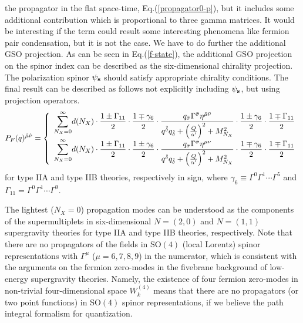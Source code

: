 \documentclass[a4paper,prd,preprint]{revtex4}
\begin{document}
 the propagator in the flat space-time, Eq.(\ref{propagator0-p}),
 but it includes some additional contribution
 which is proportional to three gamma matrices.
It would be interesting
 if the term could result some interesting phenomena
 like fermion pair condensation,
 but it is not the case.
We have to do further the additional GSO projection.
As can be seen in Eq.(\ref{f-state}),
 the additional GSO projection on the spinor index
 can be described as the six-dimensional chirality projection.
The polarization spinor $\psi_{\bf s}$
 should satisfy appropriate chirality conditions.
The final result can be described as follows
 not explicitly including $\psi_{\bf s}$,
 but using projection operators.
\begin{equation}
 P_F(q)^{{\hat \mu}{\hat \nu}} =
 \left\{
 \begin{array}{l}
  \displaystyle{\sum_{N_X=0}^\infty} d(N_X) \cdot
   {{1 \pm \Gamma_{11}} \over 2} \cdot
   {{1 \mp \gamma_6} \over 2} \cdot
  {{q_{\bar \sigma} \Gamma^{\bar \sigma} \eta^{{\bar \mu}{\bar \nu}}}
   \over
   {
   q^{\tilde \delta} q_{\tilde \delta}
   + \left( {Q \over {\alpha'}} \right)^2 + M_{N_X}^2
   }} \cdot
   {{1 \pm \gamma_6} \over 2} \cdot
   {{1 \mp \Gamma_{11}} \over 2}
 \\
  \displaystyle{\sum_{N_X=0}^\infty} d(N_X) \cdot
   {{1 \pm \Gamma_{11}} \over 2} \cdot
   {{1 \pm \gamma_6} \over 2} \cdot
  {{q_{\bar \sigma} \Gamma^{\bar \sigma} \eta^{{\mu}{\nu}}}
   \over
   {
   q^{\tilde \delta} q_{\tilde \delta}
   + \left( {Q \over {\alpha'}} \right)^2 + M_{N_X}^2
   }} \cdot
   {{1 \mp \gamma_6} \over 2} \cdot
   {{1 \mp \Gamma_{11}} \over 2}
 \end{array}
 \right.
\label{propagator-final}
\end{equation}
 for type IIA and type IIB theories, respectively in sign,
 where $\gamma_6 \equiv \Gamma^0 \Gamma^1 \cdots \Gamma^5$
 and $\Gamma_{11} = \Gamma^0 \Gamma^1 \cdots \Gamma^9$.

The lightest ($N_X=0$) propagation modes can be understood
 as the components of the supermultiplets
 in six-dimensional $N=(2,0)$ and $N=(1,1)$ supergravity theories
 for type IIA and type IIB theories, respectively.
Note that there are no propagators of the fields
 in SO$(4)$ (local Lorentz) spinor representations
 with $\Gamma^\mu$ ($\mu=6,7,8,9$) in the numerator,
 which is consistent with the arguments on the fermion zero-modes
 in the fivebrane background of low-energy supergravity theories.
Namely,
 the existence of four fermion zero-modes
 in non-trivial four-dimensional space $W^{(4)}_k$ means
 that there are no propagators (or two point functions)
 in SO$(4)$ spinor representations,
 if we believe the path integral formalism for quantization.
\end{document}
